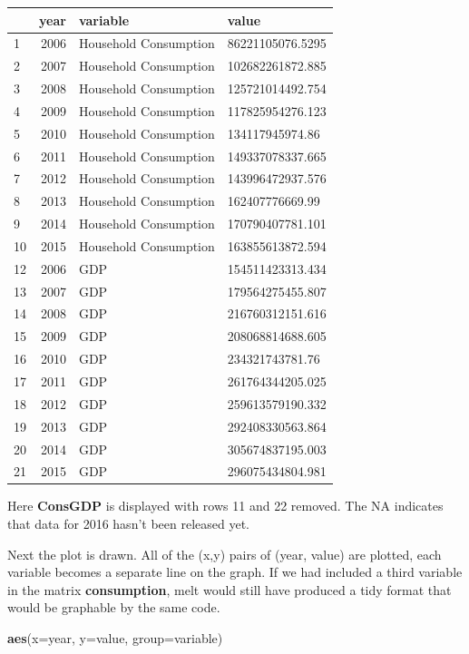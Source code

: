\documentclass[12pt,a4paper,]{article}
\newenvironment{Shaded}{\begin{snugshade}}{\end{snugshade}}
\newcommand{\KeywordTok}[1]{\textcolor[rgb]{0.13,0.29,0.53}{\textbf{{#1}}}}
\newcommand{\DataTypeTok}[1]{\textcolor[rgb]{0.13,0.29,0.53}{{#1}}}
\newcommand{\NormalTok}[1]{{#1}}
\begin{document}
\begin{tabular}{l|r|l|l}
\hline
  & year & variable & value\\
\hline
1 & 2006 & Household Consumption & 86221105076.5295\\
\hline
2 & 2007 & Household Consumption & 102682261872.885\\
\hline
3 & 2008 & Household Consumption & 125721014492.754\\
\hline
4 & 2009 & Household Consumption & 117825954276.123\\
\hline
5 & 2010 & Household Consumption & 134117945974.86\\
\hline
6 & 2011 & Household Consumption & 149337078337.665\\
\hline
7 & 2012 & Household Consumption & 143996472937.576\\
\hline
8 & 2013 & Household Consumption & 162407776669.99\\
\hline
9 & 2014 & Household Consumption & 170790407781.101\\
\hline
10 & 2015 & Household Consumption & 163855613872.594\\
\hline
12 & 2006 & GDP & 154511423313.434\\
\hline
13 & 2007 & GDP & 179564275455.807\\
\hline
14 & 2008 & GDP & 216760312151.616\\
\hline
15 & 2009 & GDP & 208068814688.605\\
\hline
16 & 2010 & GDP & 234321743781.76\\
\hline
17 & 2011 & GDP & 261764344205.025\\
\hline
18 & 2012 & GDP & 259613579190.332\\
\hline
19 & 2013 & GDP & 292408330563.864\\
\hline
20 & 2014 & GDP & 305674837195.003\\
\hline
21 & 2015 & GDP & 296075434804.981\\
\hline
\end{tabular}

Here \textbf{ConsGDP} is displayed with rows 11 and 22 removed. The NA
indicates that data for 2016 hasn't been released yet.

Next the plot is drawn. All of the (x,y) pairs of (year, value) are
plotted, each variable becomes a separate line on the graph. If we had
included a third variable in the matrix \textbf{consumption}, melt would
still have produced a tidy format that would be graphable by the same
code.

\begin{Shaded}
\begin{Highlighting}[]
\KeywordTok{aes}\NormalTok{(}\DataTypeTok{x=}\NormalTok{year, }\DataTypeTok{y=}\NormalTok{value, }\DataTypeTok{group=}\NormalTok{variable)}
\end{Highlighting}
\end{Shaded}
\end{document}
